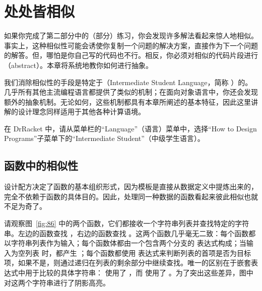
\chapter{处处皆相似}
\label{sec:ch14_similarities}

如果你完成了第二部分中的（部分）练习，你会发现许多解法看起来惊人地相似。事实上，这种相似性可能会诱使你复制一个问题的解决方案，直接作为下一个问题的解答。但，哪怕是你自己写的代码也不行。相反，你必须对相似的代码片段进行（abstract）。本章将系统地教你如何进行抽象。

我们消除相似性的手段是特定于（Intermediate Student Language，简称 ）的。几乎所有其他主流编程语言都提供了类似的机制；在面向对象语言中，你还会发现额外的抽象机制。无论如何，这些机制都具有本章所阐述的基本特征，因此这里讲解的设计理念同样适用于其他各种计算语境。

\begin{notebox}[切换教学语言]
在 DrRacket 中，请从菜单栏的“Language”（语言）菜单中，选择“How to Design Programs”子菜单下的“Intermediate Student”（中级学生语言）。
\end{notebox}

\section{函数中的相似性}
\label{sec:14_1}

设计配方决定了函数的基本组织形式，因为模板是直接从数据定义中提炼出来的，完全不依赖于函数的具体目的。因此，处理同一种数据的函数看起来彼此相似也就不足为奇了。

请观察图~\ref{fig:86} 中的两个函数，它们都接收一个字符串列表并查找特定的字符串。左边的函数查找 ，右边的函数查找 。这两个函数几乎毫无二致：每个函数都以字符串列表作为输入；每个函数体都由一个包含两个分支的  表达式构成；当输入为空列表  时，都产生 ；每个函数都使用  表达式来判断列表的首项是否为目标项，如果不是，则通过递归在列表的剩余部分中继续查找。唯一的区别在于嵌套表达式中用于比较的具体字符串： 使用了 ，而  使用了 。为了突出这些差异，图中对这两个字符串进行了阴影高亮。


